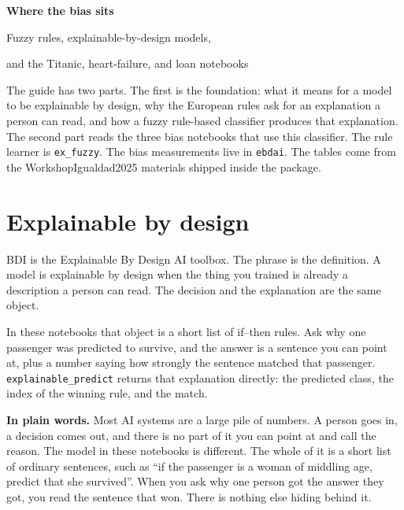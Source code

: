\documentclass[11pt]{article}
\newcommand{\fn}[1]{\texttt{\small #1}}
\begin{document}
\color{ebdink}
\raggedbottom
\thispagestyle{fancy}

\begin{tcolorbox}[
  colback=ebdink, colframe=ebdink, arc=3pt,
  left=12pt, right=12pt, top=9pt, bottom=9pt,
  before skip=0pt, after skip=8pt,
]
{\color{white}\sffamily\bfseries\fontsize{21}{25}\selectfont Where the bias sits\par}
\vspace{3pt}
{\color{white!88}\sffamily Fuzzy rules, explainable-by-design models,\par and the Titanic, heart-failure, and loan notebooks\par}
\end{tcolorbox}

\noindent
The guide has two parts. The first is the foundation: what it means for a model to be explainable by design, why the European rules ask for an explanation a person can read, and how a fuzzy rule-based classifier produces that explanation. The second part reads the three bias notebooks that use this classifier. The rule learner is \fn{ex\_fuzzy}. The bias measurements live in \fn{ebdai}. The tables come from the WorkshopIgualdad2025 materials shipped inside the package.

\section{Explainable by design}
\label{sec:ebd}

BDI is the Explainable By Design AI toolbox. The phrase is the definition. A model is explainable by design when the thing you trained is already a description a person can read. The decision and the explanation are the same object.

In these notebooks that object is a short list of if--then rules. Ask why one passenger was predicted to survive, and the answer is a sentence you can point at, plus a number saying how strongly the sentence matched that passenger. \fn{explainable\_predict} returns that explanation directly: the predicted class, the index of the winning rule, and the match.

\begin{plainwords}
\textbf{In plain words.} Most AI systems are a large pile of numbers. A person goes in, a decision comes out, and there is no part of it you can point at and call the reason. The model in these notebooks is different. The whole of it is a short list of ordinary sentences, such as ``if the passenger is a woman of middling age, predict that she survived''. When you ask why one person got the answer they got, you read the sentence that won. There is nothing else hiding behind it.
\end{plainwords}
\end{document}
